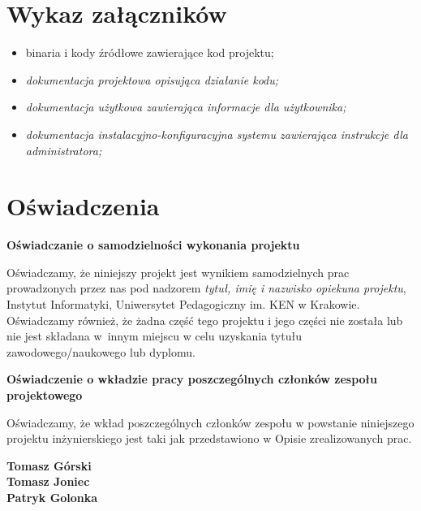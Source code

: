 \documentclass[12pt,a4paper,oneside]{article}
\theoremstyle{definition}
\numberwithin{equation}{section}
\begin{document}
\section{Wykaz załączników}

\begin{itemize}
\item {binaria i kody źródłowe zawierające kod projektu;}
\item \textit{dokumentacja projektowa opisująca działanie kodu;}
\item \textit{dokumentacja użytkowa zawierająca informacje dla użytkownika;}
\item \textit{dokumentacja instalacyjno-konfiguracyjna systemu zawierająca instrukcje dla administratora;}
\end{itemize}

\section{Oświadczenia}
\begin{center}
\textbf{Oświadczanie o samodzielności wykonania projektu}
\end{center}

Oświadczamy, że niniejszy projekt jest wynikiem samodzielnych prac prowadzonych przez nas pod nadzorem \textit{tytuł, imię i nazwisko opiekuna projektu}, Instytut Informatyki, Uniwersytet Pedagogiczny im. KEN w Krakowie. Oświadczamy również, że żadna część tego projektu i jego części nie została lub nie jest składana w~innym miejscu w celu uzyskania tytułu zawodowego/naukowego lub dyplomu.


\begin{center}
\textbf{Oświadczenie o wkładzie pracy poszczególnych członków zespołu projektowego} 
\end{center}

Oświadczamy, że wkład poszczególnych członków zespołu  w powstanie niniejszego projektu inżynierskiego jest taki jak przedstawiono w Opisie zrealizowanych prac. 

\vspace*{20pt}
\noindent
\textbf{Tomasz Górski} \\
\textbf{Tomasz Joniec} \\
\textbf{Patryk Golonka}\\
\vspace*{20pt}

\pagebreak






%
%
%
\end{document}
